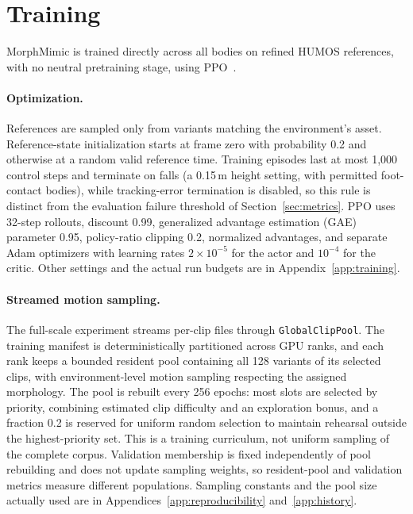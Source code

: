 \section{Training}\label{sec:training}
MorphMimic is trained directly across all bodies on refined HUMOS references,
with no neutral pretraining stage, using PPO~\cite{ppo}.

\paragraph{Optimization.}
References are sampled only from variants matching the environment's asset.
Reference-state initialization starts at frame zero with probability 0.2 and
otherwise at a random valid reference time. Training episodes last at most
1,000 control steps and terminate on falls (a 0.15\,m height setting, with
permitted foot-contact bodies), while tracking-error termination is disabled, so
this rule is distinct from the evaluation failure threshold of
Section~\ref{sec:metrics}. PPO uses 32-step rollouts, discount 0.99, generalized
advantage estimation (GAE) parameter 0.95, policy-ratio clipping 0.2, normalized advantages, and separate
Adam optimizers with learning rates $2\times10^{-5}$ for the actor and
$10^{-4}$ for the critic. Other settings and the actual run budgets are in
Appendix~\ref{app:training}.

\paragraph{Streamed motion sampling.}
The full-scale experiment streams per-clip files through
\texttt{GlobalClipPool}. The training manifest is deterministically partitioned
across GPU ranks, and each rank keeps a bounded resident pool containing all 128
variants of its selected clips, with environment-level motion sampling
respecting the assigned morphology. The pool is rebuilt every 256 epochs: most
slots are selected by priority, combining estimated clip difficulty and an
exploration bonus, and a fraction 0.2 is reserved for uniform random selection
to maintain rehearsal outside the highest-priority set. This is a training
curriculum, not uniform sampling of the complete corpus. Validation membership
is fixed independently of pool rebuilding and does not update sampling weights,
so resident-pool and validation metrics measure different populations. Sampling
constants and the pool size actually used are in
Appendices~\ref{app:reproducibility} and~\ref{app:history}.
